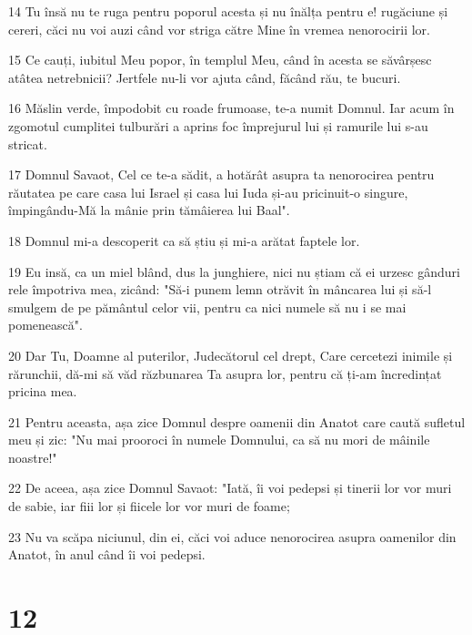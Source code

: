\par 14 Tu însă nu te ruga pentru poporul acesta și nu înălța pentru e! rugăciune și cereri, căci nu voi auzi când vor striga către Mine în vremea nenorocirii lor.
\par 15 Ce cauți, iubitul Meu popor, în templul Meu, când în acesta se săvârșesc atâtea netrebnicii? Jertfele nu-li vor ajuta când, făcând rău, te bucuri.
\par 16 Măslin verde, împodobit cu roade frumoase, te-a numit Domnul. Iar acum în zgomotul cumplitei tulburări a aprins foc împrejurul lui și ramurile lui s-au stricat.
\par 17 Domnul Savaot, Cel ce te-a sădit, a hotărât asupra ta nenorocirea pentru răutatea pe care casa lui Israel și casa lui Iuda și-au pricinuit-o singure, împingându-Mă la mânie prin tămâierea lui Baal".
\par 18 Domnul mi-a descoperit ca să știu și mi-a arătat faptele lor.
\par 19 Eu insă, ca un miel blând, dus la junghiere, nici nu știam că ei urzesc gânduri rele împotriva mea, zicând: "Să-i punem lemn otrăvit în mâncarea lui și să-l smulgem de pe pământul celor vii, pentru ca nici numele să nu i se mai pomenească".
\par 20 Dar Tu, Doamne al puterilor, Judecătorul cel drept, Care cercetezi inimile și rărunchii, dă-mi să văd răzbunarea Ta asupra lor, pentru că ți-am încredințat pricina mea.
\par 21 Pentru aceasta, așa zice Domnul despre oamenii din Anatot care caută sufletul meu și zic: "Nu mai prooroci în numele Domnului, ca să nu mori de mâinile noastre!"
\par 22 De aceea, așa zice Domnul Savaot: "Iată, îi voi pedepsi și tinerii lor vor muri de sabie, iar fiii lor și fiicele lor vor muri de foame;
\par 23 Nu va scăpa niciunul, din ei, căci voi aduce nenorocirea asupra oamenilor din Anatot, în anul când îi voi pedepsi.

\chapter{12}

